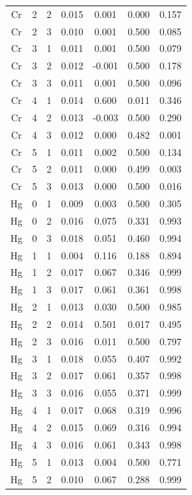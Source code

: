 \documentclass[ms, hidelinks]{uncgdissertationexp3}
\theoremstyle{plain}
\theoremstyle{definition}
\theoremstyle{remark}
\begin{document}
\begin{longtable}{ccccccc}
  Cr & 2 & 2 & 0.015 & 0.001 & 0.000 & 0.157\\
  \rowcolor{gray!6}  Cr & 2 & 3 & 0.010 & 0.001 & 0.500 & 0.085\\
  Cr & 3 & 1 & 0.011 & 0.001 & 0.500 & 0.079\\
  \rowcolor{gray!6}  Cr & 3 & 2 & 0.012 & -0.001 & 0.500 & 0.178\\
  Cr & 3 & 3 & 0.011 & 0.001 & 0.500 & 0.096\\
  \rowcolor{gray!6}  Cr & 4 & 1 & 0.014 & 0.600 & 0.011 & 0.346\\
  Cr & 4 & 2 & 0.013 & -0.003 & 0.500 & 0.290\\
  \rowcolor{gray!6}  Cr & 4 & 3 & 0.012 & 0.000 & 0.482 & 0.001\\
  Cr & 5 & 1 & 0.011 & 0.002 & 0.500 & 0.134\\
  \rowcolor{gray!6}  Cr & 5 & 2 & 0.011 & 0.000 & 0.499 & 0.003\\
  Cr & 5 & 3 & 0.013 & 0.000 & 0.500 & 0.016\\
  \rowcolor{gray!6}  Hg & 0 & 1 & 0.009 & 0.003 & 0.500 & 0.305\\
  Hg & 0 & 2 & 0.016 & 0.075 & 0.331 & 0.993\\
  \rowcolor{gray!6}  Hg & 0 & 3 & 0.018 & 0.051 & 0.460 & 0.994\\
  Hg & 1 & 1 & 0.004 & 0.116 & 0.188 & 0.894\\
  \rowcolor{gray!6}  Hg & 1 & 2 & 0.017 & 0.067 & 0.346 & 0.999\\
  Hg & 1 & 3 & 0.017 & 0.061 & 0.361 & 0.998\\
  \rowcolor{gray!6}  Hg & 2 & 1 & 0.013 & 0.030 & 0.500 & 0.985\\
  Hg & 2 & 2 & 0.014 & 0.501 & 0.017 & 0.495\\
  \rowcolor{gray!6}  Hg & 2 & 3 & 0.016 & 0.011 & 0.500 & 0.797\\
  Hg & 3 & 1 & 0.018 & 0.055 & 0.407 & 0.992\\
  \rowcolor{gray!6}  Hg & 3 & 2 & 0.017 & 0.061 & 0.357 & 0.998\\
  Hg & 3 & 3 & 0.016 & 0.055 & 0.371 & 0.999\\
  \rowcolor{gray!6}  Hg & 4 & 1 & 0.017 & 0.068 & 0.319 & 0.996\\
  Hg & 4 & 2 & 0.015 & 0.069 & 0.316 & 0.994\\
  \rowcolor{gray!6}  Hg & 4 & 3 & 0.016 & 0.061 & 0.343 & 0.998\\
  Hg & 5 & 1 & 0.013 & 0.004 & 0.500 & 0.771\\
  \rowcolor{gray!6}  Hg & 5 & 2 & 0.010 & 0.067 & 0.288 & 0.999\\

\end{longtable}
\end{document}
